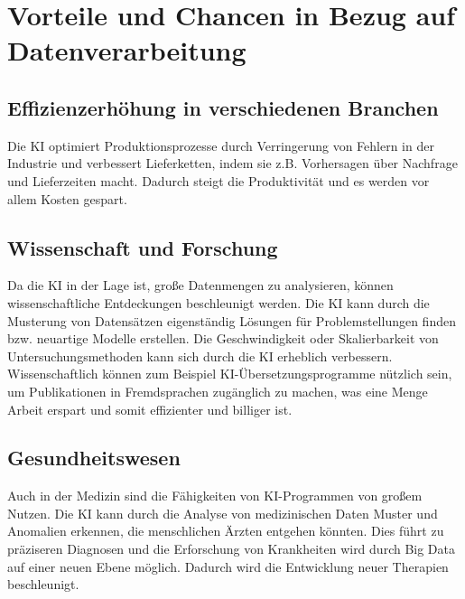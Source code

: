 \chapter{Vorteile und Chancen in Bezug auf Datenverarbeitung}
\label{chap:chancen}

\section{Effizienzerhöhung in verschiedenen Branchen}

Die KI optimiert Produktionsprozesse durch Verringerung von Fehlern in der Industrie und verbessert Lieferketten, indem sie z.B. Vorhersagen über Nachfrage und Lieferzeiten macht. Dadurch steigt die Produktivität und es werden vor allem Kosten gespart. 

\section{Wissenschaft und Forschung}

Da die KI in der Lage ist, große Datenmengen zu analysieren, können wissenschaftliche Entdeckungen beschleunigt werden. Die KI kann durch die Musterung von Datensätzen eigenständig Lösungen für Problemstellungen finden bzw. neuartige Modelle erstellen. Die Geschwindigkeit oder Skalierbarkeit von Untersuchungsmethoden kann sich durch die KI erheblich verbessern. Wissenschaftlich können zum Beispiel KI-Übersetzungsprogramme nützlich sein, um Publikationen in Fremdsprachen zugänglich zu machen, was eine Menge Arbeit erspart und somit effizienter und billiger ist.

\section{Gesundheitswesen}

Auch in der Medizin sind die Fähigkeiten von KI-Programmen von großem Nutzen. Die KI kann durch die Analyse von medizinischen Daten Muster und Anomalien erkennen, die menschlichen Ärzten entgehen könnten. Dies führt zu präziseren Diagnosen und die Erforschung von Krankheiten wird durch Big Data auf einer neuen Ebene möglich. Dadurch wird die Entwicklung neuer Therapien beschleunigt. 
